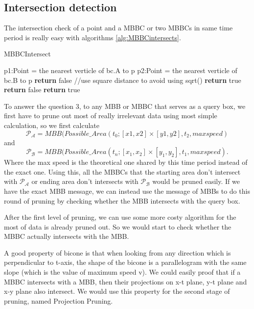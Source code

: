 \documentclass[sigplan]{acmart}
\begin{document}
\subsection{Intersection detection}
The intersection check of a point and a MBBC or two MBBCs in same time period is really easy with algorithms \ref{alg:MBBCintersects}.\par

\begin{algorithm}
\caption{MBBCIntersect} \label{alg:MBBCintersects}
\begin{algorithmic}[ht]
    \State p1:Point = the nearest verticle of bc.A to p
    \State p2:Point = the nearest verticle of bc.B to p
        \State \textbf{return} false //use square distance to avoid using sqrt()
    \EndIf
    \State \textbf{return} true
\EndFunction
{}
        \State \textbf{return} false
    \EndIf
    \State \textbf{return} true
\EndFunction
\end{algorithmic}
\end{algorithm}

To answer the question 3, to any MBB or MBBC that serves as a query box, we first have to prune out most of really irrelevant data using most simple calculation, so we first calculate
$$\mathcal{P_A} = MBB(Possible\_Area(t_0;[x1, x2] \times [y1, y2], t_2, maxspeed)$$
and
$$\mathcal{P_B} = MBB(Possible\_Area(t_n;[x_1, x_2] \times [y_1, y_2], t_1, maxspeed).$$
Where the max speed is the theoretical one shared by this time period instead of the exact one. Using this, all the MBBCs that the starting area don't intersect with $\mathcal{P_A}$ or ending area don't intersects with $\mathcal{P_B}$ would be pruned easily. If we have the exact MBB message, we can instead use the message of MBBs to do this round of pruning by checking whether the MBB intersects with the query box. \par
After the first level of pruning, we can use some more costy algorithm for the most of data is already pruned out. So we would start to check whether the MBBC actually intersects with the MBB.\par
A good property of bicone is that when looking from any direction which is perpendicular to t-axis, the shape of the bicone is a parallelogram with the same slope (which is the value of maximum speed v). We could easily proof that if a MBBC intersects with a MBB, then their projections on x-t plane, y-t plane and x-y plane also intersect. We would use this property for the second stage of pruning, named Projection Pruning. \par
\end{document}
